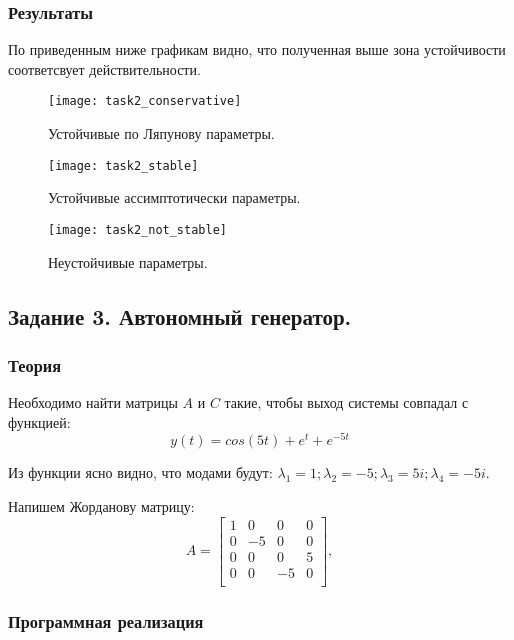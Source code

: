 \documentclass[16pt]{article}
\begin{document}
\subsubsection{Результаты}
По приведенным ниже графикам видно, что полученная выше зона устойчивости соответсвует действительности.
\begin{figure}[H]
	\centering
	\texttt{[image: task2\_conservative]}
	\caption{Устойчивые по Ляпунову параметры.}
	\label{fig:fig5}
\end{figure}
\begin{figure}[H]
	\centering
	\texttt{[image: task2\_stable]}
	\caption{Устойчивые ассимптотически параметры.}
	\label{fig:fig6}
\end{figure}
\begin{figure}[H]
	\centering
	\texttt{[image: task2\_not\_stable]}
	\caption{Неустойчивые параметры.}
	\label{fig:fig7}
\end{figure}

\newpage
\subsection{Задание 3. Автономный генератор.}
\subsubsection{Теория}
Необходимо найти матрицы \(A\) и \(C\) такие, чтобы выход системы совпадал с функцией:
\[y(t) = cos(5t) + e^t + e^{-5t}\]

Из функции ясно видно, что модами будут:
\(\lambda_1 = 1; \lambda_2 = -5; \lambda_3 = 5i; \lambda_4 = -5i.\)

Напишем Жорданову матрицу:
\[
    A = \begin{bmatrix}
    1 & 0 & 0 & 0 \\
    0 & -5 & 0 & 0 \\
    0 & 0 & 0 & 5 \\
    0 & 0 & -5 & 0 \\
    \end{bmatrix},
\]

\subsubsection{Программная реализация}
\begin{verbatim}

\end{verbatim}
\end{document}
